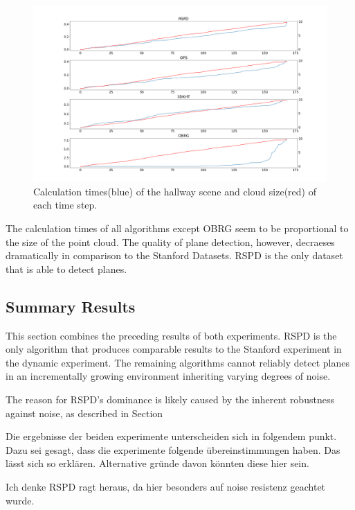 \documentclass[main.tex]{subfiles}
\begin{document}
\begin{figure}[]
    \centering
    \includegraphics[width=\textwidth]{images/dyn_time-hallway.png}
    \caption[Time Results Hallway]{Calculation times(blue) of the hallway scene and cloud size(red) of each time step.}
    \label{fig:dynhallway}
\end{figure}

The calculation times of all algorithms except OBRG seem to be proportional to the size of the point cloud.
The quality of plane detection, however, decraeses dramatically in comparison to the Stanford Datasets. RSPD is the only dataset that
is able to detect planes. %


\subsection{Summary Results}
This section combines the preceding results of both experiments.
RSPD is the only algorithm that produces comparable results to the Stanford experiment in the dynamic experiment.
The remaining algorithms cannot reliably detect planes in an incrementally growing environment inheriting varying degrees of noise.

The reason for RSPD's dominance is likely caused by the inherent robustness against noise, as described in Section~

Die ergebnisse der beiden experimente unterscheiden sich in folgendem punkt. Dazu sei gesagt, dass die experimente folgende übereinstimmungen haben.
Das lässt sich so erklären. Alternative gründe davon könnten diese hier sein.

Ich denke RSPD ragt heraus, da hier besonders auf noise resistenz geachtet wurde. %
\end{document}
